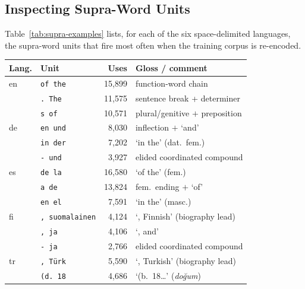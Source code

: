 \documentclass[pdflatex,sn-apa]{sn-jnl}
\begin{document}
\subsection{Inspecting Supra-Word Units}
\label{sec:supra-examples}

Table~\ref{tab:supra-examples} lists, for each of the six space-delimited
languages, the supra-word units that fire most often when the training corpus
is re-encoded.%

\begin{table}[t]
\centering
\small
\begin{tabular}{llrl}
\toprule
\textbf{Lang.} & \textbf{Unit} & \textbf{Uses} & \textbf{Gloss / comment} \\
\midrule
en & \texttt{\textvisiblespace of the} & 15{,}899 & function-word chain \\
   & \texttt{. The}                    & 11{,}575 & sentence break + determiner \\
   & \texttt{s of}                     & 10{,}571 & plural/genitive $+$ preposition \\
\midrule
de & \texttt{en und}                   &  8{,}030 & inflection $+$ `and' \\
   & \texttt{\textvisiblespace in der} &  7{,}202 & `in the' (dat.\ fem.) \\
   & \texttt{- und}                    &  3{,}927 & elided coordinated compound \\
\midrule
es & \texttt{\textvisiblespace de la}  & 16{,}580 & `of the' (fem.) \\
   & \texttt{a de}                     & 13{,}824 & fem.\ ending $+$ `of' \\
   & \texttt{\textvisiblespace en el}  &  7{,}591 & `in the' (masc.) \\
\midrule
fi & \texttt{, suomalainen}            &  4{,}124 & `, Finnish' (biography lead) \\
   & \texttt{, ja}                     &  4{,}106 & `, and' \\
   & \texttt{- ja}                     &  2{,}766 & elided coordinated compound \\
\midrule
tr & \texttt{, Türk}                   &  5{,}590 & `, Turkish' (biography lead) \\
   & \texttt{\textvisiblespace (d. 18} &  4{,}686 & `(b.\ 18\ldots' (\emph{doğum}) \\

\end{tabular}
\end{table}
\end{document}
